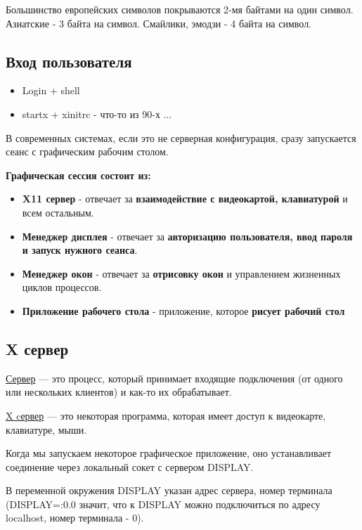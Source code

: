 Большинство европейских символов покрываются 2-мя байтами на один символ. Азиатские - 3 байта на символ. Смайлики, эмодзи - 4 байта на символ. 

\subsection{Вход пользователя}

\begin{itemize}
	\item Login + shell
	\item startx + xinitrc - что-то из 90-х ...
\end{itemize}

В современных системах, если это не серверная конфигурация, сразу запускается сеанс с графическим рабочим столом.

\textbf{Графическая сессия состоит из:}
\begin{itemize}
	\item \textbf{X11 сервер} - отвечает за \textbf{взаимодействие с видеокартой, клавиатурой} и всем остальным.
	\item \textbf{Менеджер дисплея} - отвечает за \textbf{авторизацию пользователя, ввод пароля и запуск нужного сеанса}.
	\item \textbf{Менеджер окон} - отвечает за \textbf{отрисовку окон} и управлением жизненных циклов процессов.
	\item \textbf{Приложение рабочего стола} - приложение, которое \textbf{рисует рабочий стол}
\end{itemize}

\subsection{X сервер}

\begin{Def}
	\underline{Сервер} --- это процесс, который принимает входящие подключения (от одного или нескольких клиентов) и как-то их обрабатывает.
\end{Def}

\begin{Def}
	\underline{X cервер} --- это некоторая программа, которая имеет доступ к видеокарте, клавиатуре, мыши.
\end{Def}

Когда мы запускаем некоторое графическое приложение, оно устанавливает соединение через локальный сокет с сервером DISPLAY. 

В переменной окружения DISPLAY указан адрес сервера, номер терминала (DISPLAY=:0.0 значит, что к DISPLAY можно подключиться по адресу localhost, номер терминала - 0).

